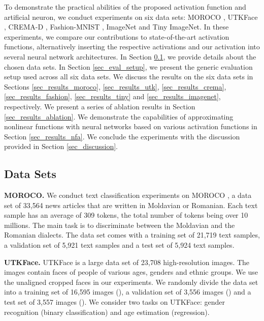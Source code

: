 \documentclass[pdflatex,sn-mathphys]{sn-jnl}
\theoremstyle{thmstyleone}
\theoremstyle{thmstyletwo}\newtheorem{example}{Example}\newtheorem{remark}{Remark}
\theoremstyle{thmstylethree}\newtheorem{definition}{Definition}\DeclareMathOperator{\sinc}{sinc}
\begin{document}
To demonstrate the practical abilities of the proposed activation function and artificial neuron, we conduct experiments on six data sets: MOROCO \citep{Butnaru-ACL-2019}, UTKFace \citep{Zhang-CVPR-2017}, CREMA-D \citep{Cao-TAC-2014}, Fashion-MNIST \citep{Xiao-A-2017}, ImageNet \citep{Russakovsky-IJCV-2015} and Tiny ImageNet. In these experiments, we compare our contributions to state-of-the-art activation functions, alternatively inserting the respective activations and our activation into several neural network architectures. In Section \ref{sec_data_sets}, we provide details about the chosen data sets. In Section \ref{sec_eval_setup}, we present the generic evaluation setup used across all six data sets. We discuss the results on the six data sets in Sections \ref{sec_results_moroco}, \ref{sec_results_utk}, \ref{sec_results_crema}, \ref{sec_results_fashion},  \ref{sec_results_tiny}  and \ref{sec_results_imagenet}, respectively. We present a series of ablation results in Section \ref{sec_results_ablation}. We demonstrate the capabilities of approximating nonlinear functions with neural networks based on various activation functions in Section \ref{sec_results_nfa}.
We conclude the experiments with the discussion provided in Section \ref{sec_discussion}.

\subsection{Data Sets}
\label{sec_data_sets}

\noindent 
{\bf MOROCO.} We conduct text classification experiments on MOROCO \citep{Butnaru-ACL-2019}, a data set of 33,564 news articles that are written in Moldavian or Romanian. Each text sample has an average of 309 tokens, the total number of tokens being over 10 millions. The main task is to discriminate between the Moldavian and the Romanian dialects. The data set comes with a training set of 21,719 text samples, a validation set of 5,921 text samples and a test set of 5,924 text samples.

\noindent 
{\bf UTKFace.}
UTKFace \citep{Zhang-CVPR-2017} is a large data set of 23,708 high-resolution images. The images contain faces of people of various ages, genders and ethnic groups. We use the unaligned cropped faces in our experiments. We randomly divide the data set into a training set of 16,595 images (), a validation set of 3,556 images () and a test set of 3,557 images (). We consider two tasks on UTKFace: gender recognition (binary classification) and age estimation (regression).
\end{document}
